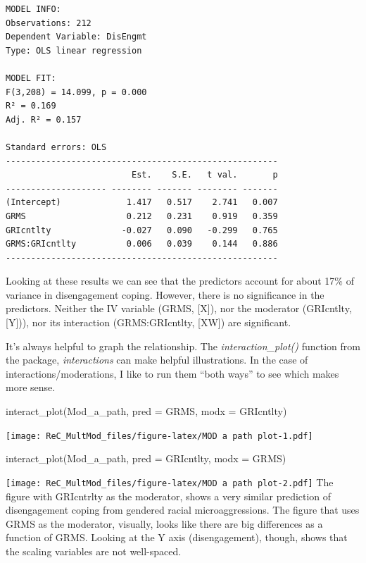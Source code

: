 \documentclass[
  11pt,
]{book}
\newenvironment{Shaded}{\begin{snugshade}}{\end{snugshade}}
\newcommand{\AttributeTok}[1]{\textcolor[rgb]{0.77,0.63,0.00}{#1}}
\newcommand{\FunctionTok}[1]{\textcolor[rgb]{0.00,0.00,0.00}{#1}}
\newcommand{\NormalTok}[1]{#1}
\begin{document}
\begin{verbatim}
MODEL INFO:
Observations: 212
Dependent Variable: DisEngmt
Type: OLS linear regression 

MODEL FIT:
F(3,208) = 14.099, p = 0.000
R² = 0.169
Adj. R² = 0.157 

Standard errors: OLS
------------------------------------------------------
                         Est.    S.E.   t val.       p
-------------------- -------- ------- -------- -------
(Intercept)             1.417   0.517    2.741   0.007
GRMS                    0.212   0.231    0.919   0.359
GRIcntlty              -0.027   0.090   -0.299   0.765
GRMS:GRIcntlty          0.006   0.039    0.144   0.886
------------------------------------------------------
\end{verbatim}

Looking at these results we can see that the predictors account for about 17\% of variance in disengagement coping. However, there is no significance in the predictors. Neither the IV variable (GRMS, {[}X{]}), nor the moderator (GRIcntlty, {[}Y{]})), nor its interaction (GRMS:GRIcntlty, {[}XW{]}) are significant.

It's always helpful to graph the relationship. The \emph{interaction\_plot()} function from the package, \emph{interactions} can make helpful illustrations. In the case of interactions/moderations, I like to run them ``both ways'' to see which makes more sense.

\begin{Shaded}
\begin{Highlighting}[]
\FunctionTok{interact\_plot}\NormalTok{(Mod\_a\_path, }\AttributeTok{pred =}\NormalTok{ GRMS, }\AttributeTok{modx =}\NormalTok{ GRIcntlty)}
\end{Highlighting}
\end{Shaded}

\texttt{[image: ReC\_MultMod\_files/figure-latex/MOD a path plot-1.pdf]}

\begin{Shaded}
\begin{Highlighting}[]
\FunctionTok{interact\_plot}\NormalTok{(Mod\_a\_path, }\AttributeTok{pred =}\NormalTok{ GRIcntlty, }\AttributeTok{modx =}\NormalTok{ GRMS)}
\end{Highlighting}
\end{Shaded}

\texttt{[image: ReC\_MultMod\_files/figure-latex/MOD a path plot-2.pdf]}
The figure with GRIcntrlty as the moderator, shows a very similar prediction of disengagement coping from gendered racial microaggressions. The figure that uses GRMS as the moderator, visually, looks like there are big differences as a function of GRMS. Looking at the Y axis (disengagement), though, shows that the scaling variables are not well-spaced.
\end{document}

